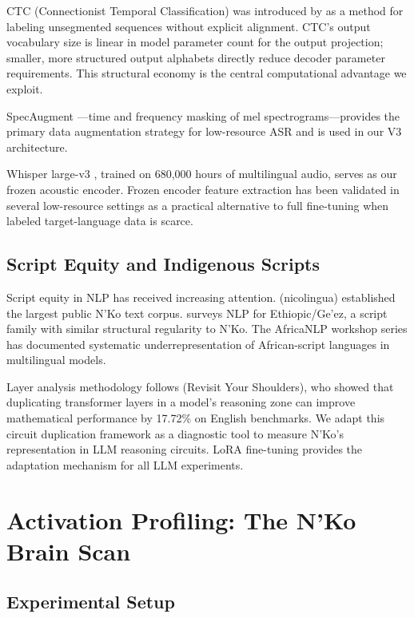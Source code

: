 \documentclass[11pt]{article}
\begin{document}
CTC (Connectionist Temporal Classification) was introduced by \citet{graves2006connectionist} as a method for labeling unsegmented sequences without explicit alignment.
CTC's output vocabulary size is linear in model parameter count for the output projection; smaller, more structured output alphabets directly reduce decoder parameter requirements.
This structural economy is the central computational advantage we exploit.

SpecAugment \cite{park2019specaugment}---time and frequency masking of mel spectrograms---provides the primary data augmentation strategy for low-resource ASR and is used in our V3 architecture.

Whisper large-v3 \cite{radford2023robust}, trained on 680,000 hours of multilingual audio, serves as our frozen acoustic encoder.
Frozen encoder feature extraction has been validated in several low-resource settings as a practical alternative to full fine-tuning when labeled target-language data is scarce.

\subsection{Script Equity and Indigenous Scripts}

Script equity in NLP has received increasing attention.
\citet{doumbouya2021} (nicolingua) established the largest public N'Ko text corpus.
\citet{tonja2023natural} surveys NLP for Ethiopic/Ge'ez, a script family with similar structural regularity to N'Ko.
The AfricaNLP workshop series has documented systematic underrepresentation of African-script languages in multilingual models.

Layer analysis methodology follows \citet{ng2024rys} (Revisit Your Shoulders), who showed that duplicating transformer layers in a model's reasoning zone can improve mathematical performance by 17.72\% on English benchmarks.
We adapt this circuit duplication framework as a diagnostic tool to measure N'Ko's representation in LLM reasoning circuits.
LoRA fine-tuning \cite{hu2022lora} provides the adaptation mechanism for all LLM experiments.

\section{Activation Profiling: The N'Ko Brain Scan}

\subsection{Experimental Setup}
\end{document}

